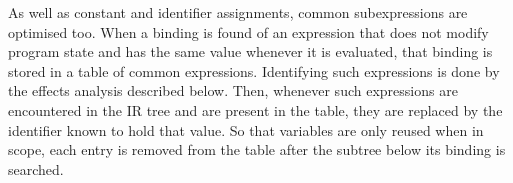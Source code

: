 
As well as constant and identifier assignments, common subexpressions are optimised too. When a binding is found of an expression that does not modify program state and has the same value whenever it is evaluated, that binding is stored in a table of common expressions. Identifying such expressions is done by the effects analysis described below. Then, whenever such expressions are encountered in the IR tree and are present in the table, they are replaced by the identifier known to hold that value. So that variables are only reused when in scope, each entry is removed from the table after the subtree below its binding is searched.


